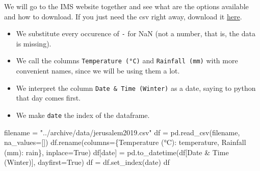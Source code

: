 \documentclass[
  letterpaper,
  DIV=11,
  numbers=noendperiod,
  oneside]{scrreprt}
\newenvironment{Shaded}{\begin{snugshade}}{\end{snugshade}}
\newcommand{\NormalTok}[1]{\textcolor[rgb]{0.00,0.23,0.31}{#1}}
\newcommand{\OperatorTok}[1]{\textcolor[rgb]{0.37,0.37,0.37}{#1}}
\newcommand{\StringTok}[1]{\textcolor[rgb]{0.13,0.47,0.30}{#1}}
\newcommand{\VariableTok}[1]{\textcolor[rgb]{0.07,0.07,0.07}{#1}}
\providecommand{\tightlist}{%
  \setlength{\itemsep}{0pt}\setlength{\parskip}{0pt}}\usepackage{longtable,booktabs,array}
\begin{document}
We will go to the IMS website together and see what are the options
available and how to download. If you just need the csv right away,
download it
\href{https://raw.githubusercontent.com/yairmau/time-series/main/archive/data/jerusalem2019.csv}{here}.

\begin{itemize}
\tightlist
\item
  We substitute every occurence of \texttt{-} for NaN (not a number,
  that is, the data is missing).
\item
  We call the columns \texttt{Temperature\ (°C)} and
  \texttt{Rainfall\ (mm)} with more convenient names, since we will be
  using them a lot.
\item
  We interpret the column \texttt{Date\ \&\ Time\ (Winter)} as a date,
  saying to python that day comes first.
\item
  We make \texttt{date} the index of the dataframe.
\end{itemize}

\begin{Shaded}
\begin{Highlighting}[]
\NormalTok{filename }\OperatorTok{=} \StringTok{"../archive/data/jerusalem2019.csv"}
\NormalTok{df }\OperatorTok{=}\NormalTok{ pd.read\_csv(filename, na\_values}\OperatorTok{=}\NormalTok{[}\StringTok{\textquotesingle{}{-}\textquotesingle{}}\NormalTok{])}
\NormalTok{df.rename(columns}\OperatorTok{=}\NormalTok{\{}\StringTok{\textquotesingle{}Temperature (°C)\textquotesingle{}}\NormalTok{: }\StringTok{\textquotesingle{}temperature\textquotesingle{}}\NormalTok{,}
                   \StringTok{\textquotesingle{}Rainfall (mm)\textquotesingle{}}\NormalTok{: }\StringTok{\textquotesingle{}rain\textquotesingle{}}\NormalTok{\}, inplace}\OperatorTok{=}\VariableTok{True}\NormalTok{)}
\NormalTok{df[}\StringTok{\textquotesingle{}date\textquotesingle{}}\NormalTok{] }\OperatorTok{=}\NormalTok{ pd.to\_datetime(df[}\StringTok{\textquotesingle{}Date \& Time (Winter)\textquotesingle{}}\NormalTok{], dayfirst}\OperatorTok{=}\VariableTok{True}\NormalTok{)}
\NormalTok{df }\OperatorTok{=}\NormalTok{ df.set\_index(}\StringTok{\textquotesingle{}date\textquotesingle{}}\NormalTok{)}
\NormalTok{df}
\end{Highlighting}
\end{Shaded}
\end{document}
